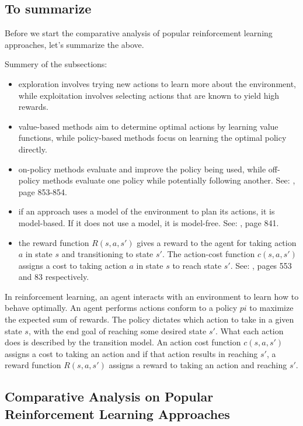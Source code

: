 \newpage
\subsection{To summarize}

Before we start the comparative analysis of popular reinforcement learning approaches, let's summarize the above.

Summery of the subsections:
\begin{itemize}
    \item exploration involves trying new actions to learn more about the environment, while exploitation involves selecting actions that are known to yield high rewards.
    \item value-based methods aim to determine optimal actions by learning value functions, while \gls{policy}-based methods focus on learning the optimal \gls{policy} directly.
    \item on-\gls{policy} methods evaluate and improve the \gls{policy} being used, while off-\gls{policy} methods evaluate one \gls{policy} while potentially following another. See: \cite{rn2022aima}, page 853-854.
    \item if an approach uses a model of the environment to plan its actions, it is model-based. If it does not use a model, it is model-free. See: \cite{rn2022aima}, page 841.
    \item the \gls{reward function} $R(s, a, s')$ gives a reward to the \gls{agent} for taking action $a$ in state $s$ and transitioning to state $s'$. The \gls{action-cost function} $c(s, a, s')$ assigns a cost to taking action $a$ in state $s$ to reach state $s'$. See: \cite{rn2022aima}, pages 553 and 83 respectively.
\end{itemize}

In reinforcement learning, an agent interacts with an environment to learn how to behave optimally.
An agent performs actions conform to a \gls{policy} $pi$ to maximize the expected sum of rewards. 
The \gls{policy} dictates which action to take in a given state $s$, with the end goal of reaching some desired state $s'$.
What each action does is described by the \gls{transition model}.
An action cost function $c(s, a, s')$ assigns a cost to taking an action and if that action results in reaching $s'$, a \gls{reward function} $R(s, a, s')$ assigns a reward to taking an action and reaching $s'$.

\newpage
\subsection{Comparative Analysis on Popular Reinforcement Learning Approaches}

